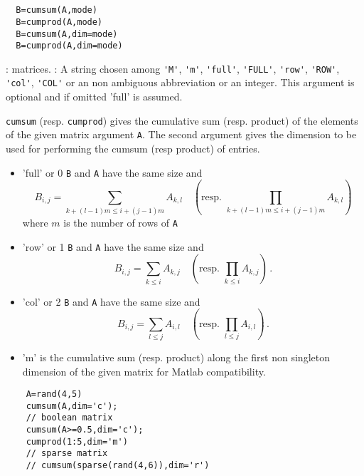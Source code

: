 \begin{mandesc}
  \\ %
  \\ %
\end{mandesc}
\begin{calling_sequence}
\begin{verbatim}
  B=cumsum(A,mode)  
  B=cumprod(A,mode)  
  B=cumsum(A,dim=mode) 
  B=cumprod(A,dim=mode)  
\end{verbatim}
\end{calling_sequence}
\begin{parameters}
  \begin{varlist}
    : matrices.
    : A string chosen among \verb+'M'+, \verb+'m'+, \verb+'full'+, \verb+'FULL'+, \verb+'row'+,
    \verb+'ROW'+, \verb+'col'+, \verb+'COL'+ or an non ambiguous abbreviation or an integer. 
    This argument is optional and if omitted 'full' is assumed.
  \end{varlist}
\end{parameters}
\begin{mandescription}
  \verb+cumsum+ (resp. \verb+cumprod+) gives the cumulative sum (resp. product) of the 
  elements of the given matrix argument \verb+A+. 
  The second argument gives the dimension to be used for performing the cumsum (resp product) of entries.       
  \begin{itemize}
  \item 'full' or 0 \verb+B+ and \verb+A+ have the same size and 
    $$B_{i,j} = \sum_{k+(l-1)m \le i+(j-1)m } A_{k,l} \quad \left( \text{resp. } \prod_{k+(l-1)m \le i+(j-1)m } A_{k,l} \right)$$ 
    where $m$ is the number of rows of \verb+A+
  \item 'row' or 1  \verb+B+ and \verb+A+ have the same size and 
    $$B_{i,j} = \sum_{k\le i} A_{k,j}\quad \left(\text{resp. }  \prod_{k\le i} A_{k,j}\right) \,. $$     
  \item 'col' or 2  \verb+B+ and \verb+A+ have the same size and 
    $$B_{i,j} = \sum_{l\le j} A_{i,l} \quad \left(\text{resp. }  \prod_{l\le j} A_{i,l}  \right) \,. $$     
  \item 'm' is the cumulative sum (resp. product) along the first non singleton dimension of the given matrix 
    for Matlab compatibility. 
  \end{itemize}
\end{mandescription}
\begin{examples}
  \begin{Verbatim}
    A=rand(4,5) 
    cumsum(A,dim='c'); 
    // boolean matrix 
    cumsum(A>=0.5,dim='c');
    cumprod(1:5,dim='m') 
    // sparse matrix 
    // cumsum(sparse(rand(4,6)),dim='r')
  \end{Verbatim}
\end{examples}
\begin{manseealso}
     
\end{manseealso}

